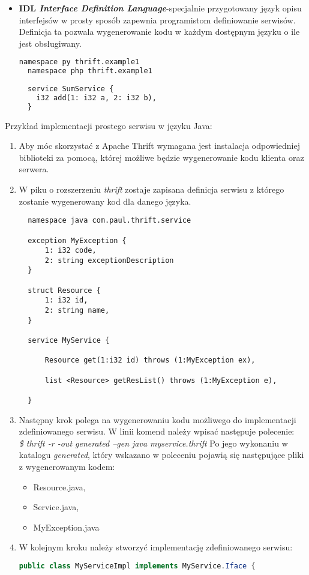 \begin{itemize}
  \item \textbf{IDL \textit{Interface Definition Language}}-specjalnie przygotowany język opisu interfejsów w prosty sposób zapewnia programistom definiowanie serwisów. Definicja ta pozwala wygenerowanie kodu w każdym dostępnym języku o ile jest obsługiwany.
        \begin{lstlisting}[language=XML, caption=Przykład definicji metody w języku IDL]
  namespace py thrift.example1
  namespace php thrift.example1
 
  service SumService {
    i32 add(1: i32 a, 2: i32 b),
  }
  \end{lstlisting}
\end{itemize}
Przykład implementacji prostego serwisu w języku Java:
\begin{enumerate}
  \item Aby móc skorzystać z Apache Thrift wymagana jest instalacja odpowiedniej biblioteki za pomocą, której możliwe będzie wygenerowanie kodu klienta oraz serwera.
  \item W piku o rozszerzeniu \textit{thrift} zostaje zapisana definicja serwisu z którego zostanie wygenerowany kod dla danego języka.
\begin{lstlisting}
  namespace java com.paul.thrift.service
    
  exception MyException {
      1: i32 code,
      2: string exceptionDescription
  }
    
  struct Resource {
      1: i32 id,
      2: string name,
  }
    
  service MyService {
    
      Resource get(1:i32 id) throws (1:MyException ex),
    
      list <Resource> getResList() throws (1:MyException e),
    
  }
  \end{lstlisting}
  \item Następny krok polega na wygenerowaniu kodu możliwego do implementacji zdefiniowanego serwisu. W linii komend należy wpisać następuje polecenie:\\
        \textit{\$ thrift -r -out generated --gen java myservice.thrift}
        Po jego wykonaniu w katalogu \textit{generated}, który wskazano w poleceniu pojawią się następujące pliki z wygenerowanym kodem:
        \begin{itemize}
          \item Resource.java,
          \item Service.java,
          \item MyException.java
        \end{itemize}
  \item W kolejnym kroku należy stworzyć implementację zdefiniowanego serwisu:
        \begin{lstlisting}[language=java, caption=Implementacja kodu usługi]
  public class MyServiceImpl implements MyService.Iface {


\end{lstlisting}
\end{enumerate}

